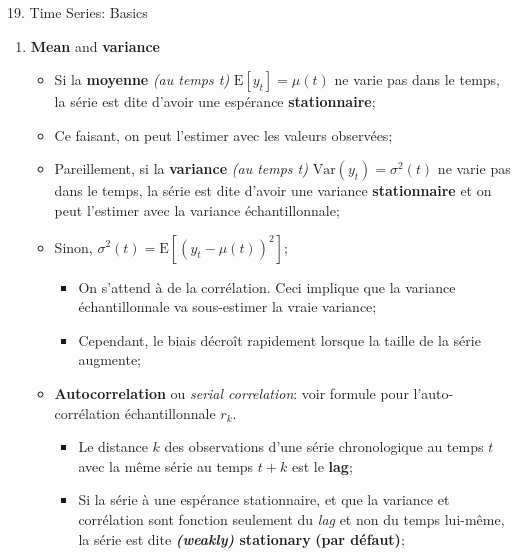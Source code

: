 \documentclass[12pt, titlepage, french]{report}
\begin{document}
\begin{CHPT_SUMM}{19. Time Series: Basics}
\begin{enumerate}
\begin{itemize}
		\item	Les modèles de séries chronologiques adressent quelques problèmes des modèles de régression:		
		\begin{itemize}
			\item	Les modèles de régression sont \textbf{naïve dans le sens qu'ils ignorent l'information autre que la série chronologique étant ajusté}.
			\item	\textit{Un autre négatif est que le modèle de régression allouent plus de poids aux observations récentes (celles ayant les statistiques $t$ les plus éloignés de la moyenne)};
			\item	La différence en modélisation de données chronologiques vs transversales est bien expliquée dans le vidéo de Ben Lambert;
		\end{itemize} 
	\end{itemize}
	\item	\textbf{Mean} and \textbf{variance}
	\begin{itemize}
		\item	Si la \textbf{moyenne} \textit{(au temps t)} $\text{E}[y_{t}] = \mu(t)$ ne varie pas dans le temps, la série est dite d'avoir une espérance \textbf{stationnaire};
		\item	Ce faisant, on peut l'estimer avec les valeurs observées;
		\item	Pareillement, si la \textbf{variance} \textit{(au temps t)} $\text{Var}(y_{t}) = \sigma^{2}(t)$ ne varie pas dans le temps, la série est dite d'avoir une variance \textbf{stationnaire} et on peut l'estimer avec la variance échantillonnale;
		\item[]	Sinon, $\sigma^{2}(t) = \text{E}[(y_{t} - \mu(t))^{2}]$;
		\begin{itemize}
			\item	On s'attend à de la corrélation. Ceci implique que la variance échantillonnale va sous-estimer la vraie variance;
			\item	Cependant, le biais décroît rapidement lorsque la taille de la série augmente;
		\end{itemize}
		\item	\textbf{Autocorrelation} ou \textit{serial correlation}: voir formule pour l'auto-corrélation échantillonnale $r_{k}$.
		\begin{itemize}
			\item	Le distance $k$ des observations d'une série chronologique au temps $t$ avec la même série au temps $t + k$ est le \textbf{lag};
			\item	Si la série à une espérance stationnaire, et que la variance et corrélation sont fonction seulement du \textit{lag} et non du temps lui-même, la série est dite \textbf{\textit{(weakly)} stationary} \textbf{(par défaut)};

\end{itemize}
\end{itemize}
\end{enumerate}
\end{CHPT_SUMM}
\end{document}
